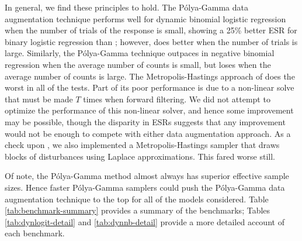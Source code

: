 \documentclass[12pt]{article}
\newcommand{\Polya}{P\'{o}lya}
\begin{document}
In general, we find these principles to hold.  The \Polya-Gamma data
augmentation technique performs well for dynamic binomial logistic regression
when the number of trials of the response is small, showing a 25\% better ESR
for binary logistic regression than \cite{fussl-etal-2013}; however,
\cite{fussl-etal-2013} does better when the number of trials is large.
Similarly, the \Polya-Gamma technique outpaces
\cite{fruhwirth-schnatter-etal-2009} in negative binomial regression when the
average number of counts is small, but loses when the average number of counts
is large.  The Metropolis-Hastings approach of \cite{migon-etal-2013} does the
worst in all of the tests.  Part of its poor performance is due to a non-linear
solve that must be made $T$ times when forward filtering.  We did not attempt to
optimize the performance of this non-linear solver, and hence some improvement
may be possible, though the disparity in ESRs suggests that any improvement
would not be enough to compete with either data augmentation approach.  As a
check upon \cite{migon-etal-2013}, we also implemented a Metropolis-Hastings
sampler that draws blocks of disturbances using Laplace approximations.  This
fared worse still.

Of note, the \Polya-Gamma method almost always has superior effective sample
sizes.  Hence faster \Polya-Gamma samplers could push the \Polya-Gamma data
augmentation technique to the top for all of the models considered.  Table
\ref{tab:benchmark-summary} provides a summary of the benchmarks; Tables
\ref{tab:dynlogit-detail} and \ref{tab:dynnb-detail} provide a more detailed
account of each benchmark.
\end{document}
